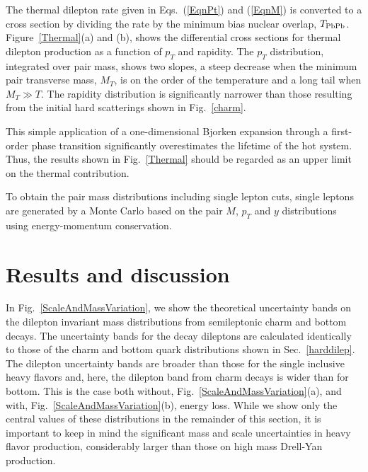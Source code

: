 The thermal dilepton rate given in Eqs.~(\ref{EqnPt}) and
(\ref{EqnM}) is converted to a cross section by dividing the rate by the
minimum bias nuclear overlap, $T_{\rm PbPb}$.
Figure~\ref{Thermal}(a) and (b), shows the differential cross sections for thermal
dilepton production as a function
of $p_T$ and rapidity.  The $p_T$ distribution, integrated over pair mass, shows
two slopes, a steep decrease when the minimum pair transverse mass, $M_T$, is 
on the order of the temperature and a long tail when $M_T \gg T$.  The rapidity
distribution is significantly narrower than those resulting from the initial
hard scatterings shown in Fig.~\ref{charm}. 

This simple application of a one-dimensional Bjorken expansion through a 
first-order phase transition significantly overestimates the lifetime of
the hot system. Thus, the results shown in Fig.~\ref{Thermal} should be 
regarded as an upper limit on the thermal
contribution. 

To obtain the pair mass distributions including single lepton cuts, single
leptons are generated by a Monte Carlo based on the pair $M$, $p_T$ and $y$ 
distributions using energy-momentum conservation.   


\section{Results and discussion}

In Fig.~\ref{ScaleAndMassVariation}, we show the theoretical uncertainty bands 
on the dilepton invariant mass distributions from semileptonic charm and bottom 
decays. The uncertainty bands for the decay dileptons are calculated identically
to those of the charm and bottom quark distributions shown in 
Sec.~\ref{harddilep}.  The dilepton uncertainty bands are broader than those
for the single inclusive heavy flavors and, here, the dilepton band from charm
decays is wider than for bottom.  This is the case both without, 
Fig.~\ref{ScaleAndMassVariation}(a), and with, 
Fig.~\ref{ScaleAndMassVariation}(b), energy loss.  
While we show only the central values of these distributions in the remainder 
of this section, it is important to keep in mind the significant mass and 
scale uncertainties in heavy flavor production, considerably larger
than those on high mass Drell-Yan production.

